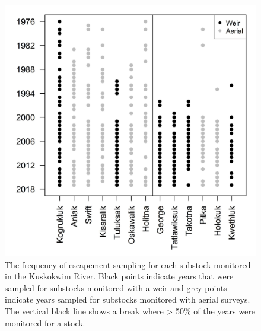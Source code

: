 \documentclass[12pt,]{book}
\theoremstyle{definition}
\theoremstyle{definition}
\theoremstyle{definition}
\theoremstyle{remark}
\begin{document}
\clearpage

\begin{figure}
  \centering
  \includegraphics{img/Ch4/obs-freq.jpg}
  \caption{The frequency of escapement sampling for each substock monitored in the Kuskokwim River. Black points indicate years that were sampled for substocks monitored with a weir and grey points indicate years sampled for substocks monitored with aerial surveys. The vertical black line shows a break where > 50\% of the years were monitored for a stock.}
  \label{fig:obs-freq}
\end{figure}

\clearpage
\end{document}
